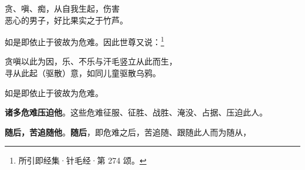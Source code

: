 
\begin{quoting}
    \begin{quoting}
        贪、嗔、痴，从自我生起，伤害\\
        恶心的男子，好比果实之于竹芦。

    \end{quoting}
\end{quoting}

如是即依止于彼故为危难。因此世尊又说：\footnote{所引即经集·针毛经·第 274 颂。}


\begin{quoting}贪嗔以此为因，乐、不乐与汗毛竖立从此而生，\\寻从此起（驱散）意，如同儿童驱散乌鸦。\end{quoting}


如是即依止于彼故为危难。


\textbf{诸多危难压迫他}。这些危难征服、征胜、战胜、淹没、占据、压迫此人。


\textbf{随后，苦追随他}。\textbf{随后}，即危难之后，苦追随、跟随此人而为随从，

